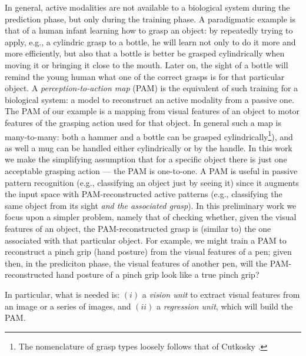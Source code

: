 In general, active modalities are not available to a biological system during the prediction phase, but only during the training phase. A paradigmatic example is that of a human infant learning how to grasp an object: by repeatedly trying to apply, e.g., a cylindric grasp to a bottle, he will learn not only to do it more and more efficiently, but also that a bottle is better be grasped cylindrically when moving it or bringing it close to the mouth. Later on, the sight of a bottle will remind the young human what one of the correct grasps is for that particular object. 
A \emph{perception-to-action map} (PAM) is the equivalent of such training for a biological system: a model to reconstruct an active modality from a passive one. The PAM of our example is a mapping from visual features of an object to motor features of the grasping action used for that object. In general such a map is many-to-many: both a hammer and a bottle can be grasped cylindrically\footnote{The nomenclature of grasp types loosely follows that of Cutkosky \cite{cutkosky}.}), and as well a mug can be handled either cylindrically or by the handle. In this work we make the simplifying assumption that for a specific object there is just one acceptable grasping action --- the PAM is one-to-one.
A PAM is useful in passive pattern recognition (e.g., classifying an object just by seeing it) since it augments the input space with PAM-reconstructed active patterns (e.g., classifying the same object from its sight \emph{and the associated grasp}). In this preliminary work we focus upon a simpler problem, namely that of checking whether, given the visual features of an object, the PAM-reconstructed grasp is (similar to) the one associated with that particular object. For example, we might train a PAM to reconstruct a pinch grip (hand posture) from the visual features of a pen; given then, in the prediciton phase, the visual features of another pen, will the PAM-reconstructed hand posture of a pinch grip look like a true pinch grip?



In particular, what is needed is: $(i)$ a \emph{vision unit} to extract visual features from an image or a series of images, and $(ii)$ a \emph{regression unit}, which will build the PAM.


